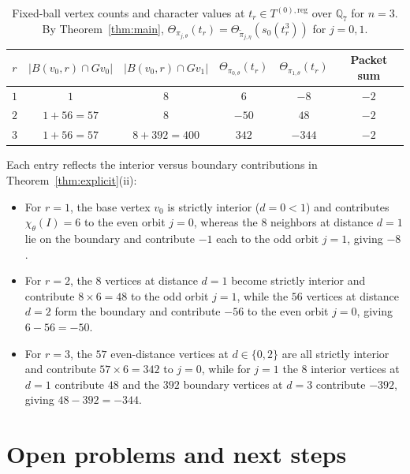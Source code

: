 \documentclass[12pt, letterpaper]{article}
\numberwithin{equation}{section}
\theoremstyle{definition}
\theoremstyle{remark}
\begin{document}
\begin{table}[ht]
\centering
\caption{Fixed-ball vertex counts and character values at $t_r\in T^{(0),\mathrm{reg}}$ over $\mathbb{Q}_7$ for $n=3$. By Theorem~\ref{thm:main}, $\Theta_{\pi_{j,\theta}}(t_r)=\Theta_{\widetilde{\pi}_{j,\eta}}(s_0(t_r^3))$ for $j=0,1$.}\label{tab:Q7}
\vspace{4pt}
\small
\begin{tabular}{@{}cccccc@{}}
\toprule
$r$ & $\bigl|B(v_0,r)\cap Gv_0\bigr|$ & $\bigl|B(v_0,r)\cap Gv_1\bigr|$ & $\Theta_{\pi_{0,\theta}}(t_r)$ & $\Theta_{\pi_{1,\theta}}(t_r)$ & Packet sum \\
\midrule
$1$ & $1$ & $8$ & $6$ & $-8$ & $-2$ \\
$2$ & $1+56=57$ & $8$ & $-50$ & $48$ & $-2$ \\
$3$ & $1+56=57$ & $8+392=400$ & $342$ & $-344$ & $-2$ \\
\bottomrule
\end{tabular}
\end{table}

Each entry reflects the interior versus boundary contributions in Theorem~\ref{thm:explicit}(ii):
\begin{itemize}
 \item For $r=1$, the base vertex $v_0$ is strictly interior ($d=0<1$) and contributes $\chi_\theta(I)=6$ to the even orbit $j=0$, whereas the $8$ neighbors at distance $d=1$ lie on the boundary and contribute $-1$ each to the odd orbit $j=1$, giving $-8$.
 \item For $r=2$, the $8$ vertices at distance $d=1$ become strictly interior and contribute $8\times 6=48$ to the odd orbit $j=1$, while the $56$ vertices at distance $d=2$ form the boundary and contribute $-56$ to the even orbit $j=0$, giving $6-56=-50$.
 \item For $r=3$, the $57$ even-distance vertices at $d\in\{0,2\}$ are all strictly interior and contribute $57\times 6=342$ to $j=0$, while for $j=1$ the $8$ interior vertices at $d=1$ contribute $48$ and the $392$ boundary vertices at $d=3$ contribute $-392$, giving $48-392=-344$.
\end{itemize}

\section{Open problems and next steps}\label{sec:open}
\end{document}
